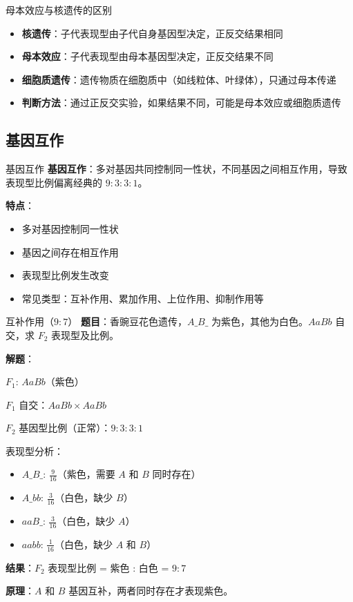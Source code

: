 \documentclass[a4paper,11pt]{ctexart}
\begin{document}
\begin{lemmabox}{母本效应与核遗传的区别}
\begin{itemize}[leftmargin=2em]
    \item \textbf{核遗传}：子代表现型由子代自身基因型决定，正反交结果相同
    \item \textbf{母本效应}：子代表现型由母本基因型决定，正反交结果不同
    \item \textbf{细胞质遗传}：遗传物质在细胞质中（如线粒体、叶绿体），只通过母本传递
    \item \textbf{判断方法}：通过正反交实验，如果结果不同，可能是母本效应或细胞质遗传
\end{itemize}
\end{lemmabox}

\subsection{基因互作}

\begin{definitionbox}{基因互作}
\textbf{基因互作}：多对基因共同控制同一性状，不同基因之间相互作用，导致表现型比例偏离经典的 $9:3:3:1$。

\textbf{特点}：
\begin{itemize}[leftmargin=2em]
    \item 多对基因控制同一性状
    \item 基因之间存在相互作用
    \item 表现型比例发生改变
    \item 常见类型：互补作用、累加作用、上位作用、抑制作用等
\end{itemize}
\end{definitionbox}

\begin{examplebox}{互补作用（$9:7$）}
\textbf{题目}：香豌豆花色遗传，$A\_B\_$ 为紫色，其他为白色。$AaBb$ 自交，求 $F_2$ 表现型及比例。

\textbf{解题}：

$F_1$: $AaBb$（紫色）

$F_1$ 自交：$AaBb \times AaBb$

$F_2$ 基因型比例（正常）：$9:3:3:1$

表现型分析：
\begin{itemize}[leftmargin=2em]
    \item $A\_B\_$: $\frac{9}{16}$（紫色，需要 $A$ 和 $B$ 同时存在）
    \item $A\_bb$: $\frac{3}{16}$（白色，缺少 $B$）
    \item $aaB\_$: $\frac{3}{16}$（白色，缺少 $A$）
    \item $aabb$: $\frac{1}{16}$（白色，缺少 $A$ 和 $B$）
\end{itemize}

\textbf{结果}：$F_2$ 表现型比例 = 紫色 : 白色 = $9:7$

\textbf{原理}：$A$ 和 $B$ 基因互补，两者同时存在才表现紫色。
\end{examplebox}
\end{document}
